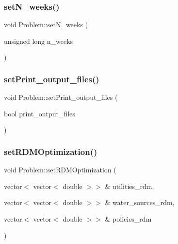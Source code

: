 \subsubsection{\texorpdfstring{set\+N\+\_\+weeks()}{setN\_weeks()}}
{\footnotesize\ttfamily void Problem\+::set\+N\+\_\+weeks (\begin{DoxyParamCaption}\item[{unsigned long}]{n\+\_\+weeks }\end{DoxyParamCaption})}

\mbox{\label{classProblem_a1f055d5e57392700cab27efdd4577be9}} 
\subsubsection{\texorpdfstring{set\+Print\+\_\+output\+\_\+files()}{setPrint\_output\_files()}}
{\footnotesize\ttfamily void Problem\+::set\+Print\+\_\+output\+\_\+files (\begin{DoxyParamCaption}\item[{bool}]{print\+\_\+output\+\_\+files }\end{DoxyParamCaption})}

\mbox{\label{classProblem_a98115002e741e9220f7aa6bae0cb179c}} 
\subsubsection{\texorpdfstring{set\+R\+D\+M\+Optimization()}{setRDMOptimization()}}
{\footnotesize\ttfamily void Problem\+::set\+R\+D\+M\+Optimization (\begin{DoxyParamCaption}\item[{vector$<$ vector$<$ double $>$$>$ \&}]{utilities\+\_\+rdm,  }\item[{vector$<$ vector$<$ double $>$$>$ \&}]{water\+\_\+sources\+\_\+rdm,  }\item[{vector$<$ vector$<$ double $>$$>$ \&}]{policies\+\_\+rdm }\end{DoxyParamCaption})}

\mbox{\label{classProblem_abaf4b2698552702ccf709bf07ed76ca3}} 

